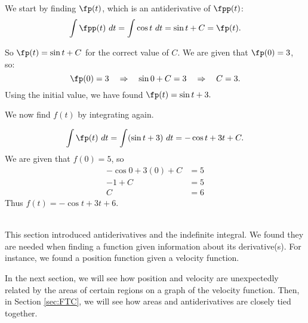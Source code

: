 {We start by finding $\fp(t)$, which is an antiderivative of $\fpp(t)$:
		$$\int \fpp(t)\ dt = \int \cos t\ dt = \sin t + C = \fp(t).$$
		
		So $\fp(t) = \sin t+C$ for the correct value of $C$. We are given that $\fp(0) = 3$, so:
		$$\fp(0) = 3 \quad \Rightarrow \quad \sin 0+C = 3 \quad \Rightarrow \quad C=3.$$
		Using the initial value, we have found $\fp(t) = \sin t+ 3.$
		
We now find $f(t)$ by integrating again.

$$\int \fp(t) \ dt = \int (\sin t+3)\ dt = -\cos t + 3t + C.$$ 
We are given that $f(0) = 5$, so
\begin{align*}
-\cos 0 + 3(0) + C &= 5 \\
-1 + C &= 5\\
C &= 6
\end{align*}
 Thus $f(t) = -\cos t + 3t + 6$.
}\\

This section introduced antiderivatives and the indefinite integral. We found they are needed when finding a function given information about its derivative(s). For instance, we found a position function given a velocity function.

In the next section, we will see how position and velocity are unexpectedly related by the areas of certain regions on a graph of the velocity function. Then, in Section \ref{sec:FTC}, we will see how areas and antiderivatives are closely tied together.

